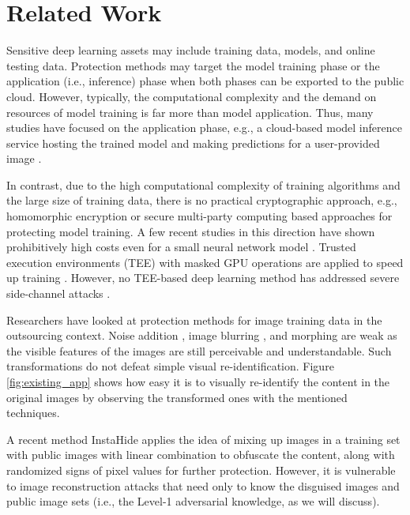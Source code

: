 \documentclass[conference]{IEEEtran}
\begin{document}


\section{Related Work}
Sensitive deep learning assets may include training data, models, and online testing data. Protection methods may target the model training phase or the application (i.e., inference) phase when both phases can be exported to the public cloud. However, typically, the computational complexity and the demand on resources of model training is far more than model application. Thus, many studies have focused on the application phase, e.g., a cloud-based model inference service hosting the trained model and making predictions for a user-provided image \cite{gilad16,rathee20,huang22}. 

In contrast, due to the high computational complexity of training algorithms and the large size of training data, there is no practical cryptographic approach, e.g., homomorphic encryption or secure multi-party computing based approaches for protecting model training. A few recent studies in this direction have shown prohibitively high costs even for a small neural network model \cite{mohassel17,sharma19}. Trusted execution environments (TEE) with masked GPU operations are applied to speed up training \cite{ng21,tramer18}. However, no TEE-based deep learning method has addressed severe side-channel attacks \cite{fei21}. 

Researchers have looked at protection methods for image training data in the outsourcing context. Noise addition \cite{fan18}, image blurring \cite{li17}, and morphing \cite{lee96_morph} are weak as the visible features of the images are still perceivable and understandable. Such transformations do not defeat simple visual re-identification. Figure \ref{fig:existing_app} shows how easy it is to visually re-identify the content in the original images by observing the transformed ones with the mentioned techniques. 

A recent method InstaHide \cite{huang20} applies the idea of mixing up images \cite{zhang18} in a training set with public images with linear combination to obfuscate the content,  along with randomized signs of pixel values for further protection. However, it is vulnerable to image reconstruction attacks \cite{carlini21} that need only to know the disguised images and public image sets (i.e., the Level-1 adversarial knowledge, as we will discuss). 
\end{document}
